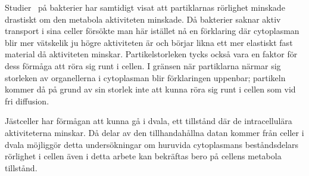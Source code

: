 Studier~\cite{Parry_etal2014} på bakterier har samtidigt visat att
partiklarnas rörlighet minskade drastiskt om den metabola aktiviteten
minskade. Då bakterier saknar aktiv transport i sina celler försökte man här istället nå en förklaring där cytoplasman blir mer vätskelik ju högre aktiviteten är och börjar
likna ett mer elastiskt fast material då aktiviteten
minskar. Partikelstorleken tycks också vara en faktor för dess förmåga
att röra sig runt i cellen. I gränsen när partiklarna närmar sig
storleken av organellerna i cytoplasman blir förklaringen uppenbar;
partikeln kommer då på grund av sin storlek inte att kunna röra sig
runt i cellen som vid fri diffusion. 

Jästceller har förmågan att kunna gå i dvala, ett tillstånd där de
intracellulära aktiviteterna minskar. Då delar av den tillhandahållna
datan kommer från celler i dvala möjliggör detta undersökningar om
huruvida cytoplasmans beståndsdelars rörlighet i cellen även i detta arbete kan bekräftas bero på
cellens metabola tillstånd. 

